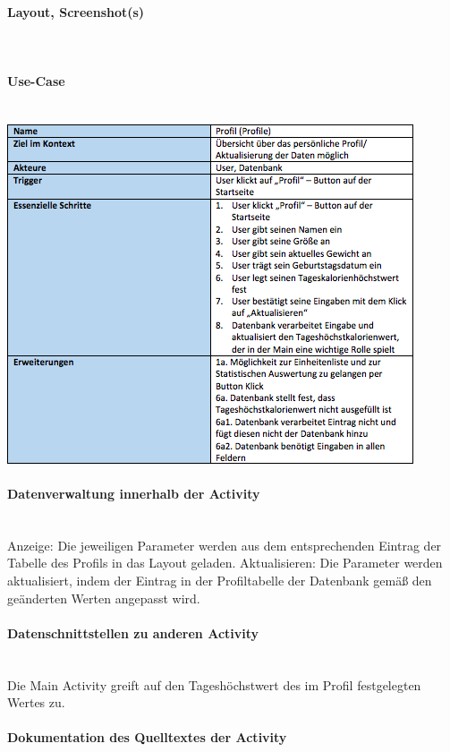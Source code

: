 \paragraph{Layout, Screenshot(s)}\\
\paragraph{Use-Case}$~~$\\
\newline
\includegraphics[scale=1]{img/usecaseprofile}\\
\paragraph{Datenverwaltung innerhalb der Activity}\\
Anzeige: Die jeweiligen Parameter werden aus dem entsprechenden Eintrag der Tabelle des Profils in das Layout geladen. 
Aktualisieren: Die Parameter werden aktualisiert, indem der Eintrag in der Profiltabelle der Datenbank gemäß den geänderten Werten angepasst wird.

\paragraph{Datenschnittstellen zu anderen Activity}\\
Die Main Activity greift auf den Tageshöchstwert des im Profil festgelegten Wertes zu.

\paragraph{Dokumentation des Quelltextes der Activity}\\

